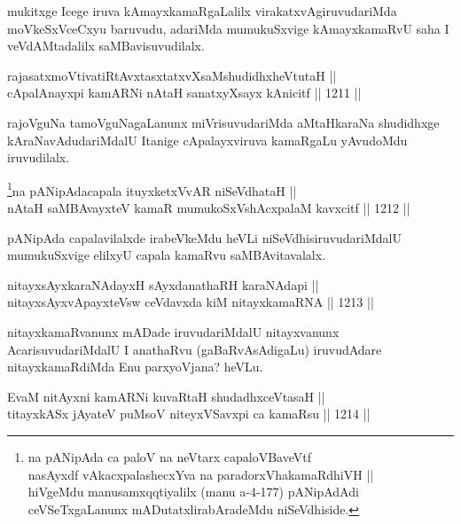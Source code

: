 \begin{artha}
mukitxge Icege iruva kAmayxkamaRgaLalilx virakatxvAgiruvudariMda moVkeSxVceCxyu baruvudu, adariMda mumukuSxvige kAmayxkamaRvU saha I veVdAMtadalilx saMBavisuvudilalx.
\end{artha}

\begin{shl}
rajasatxmoVtivatiRtAvxtasxtatxvXsaMshudidhxheVtutaH || \\
cApalAnayxpi kamARNi nAtaH sanatxyXsayx kAnicitf \hfill || 1211 ||  
\end{shl}

\begin{artha}
rajoVguNa tamoVguNagaLanunx miVrisuvudariMda aMtaHkaraNa shudidhxge kAraNavAdudariMdalU Itanige cApalayxviruva kamaRgaLu yAvudoMdu iruvudilalx.
\end{artha}


\begin{shl}
\footnote{na pANipAda ca paloV na neVtarx capaloVBaveVtf\\nasAyxdf vAkacxpalashecxYva na paradorxVhakamaRdhiVH ||\\ hiVgeMdu manusamxqqtiyalilx (manu a-4-177) pANipAdAdi ceVSeTxgaLanunx mADutatxlira\-bAradeMdu niSeVdhiside.}na pANipAdacapala ituyxketxVvAR niSeVdhataH || \\
nAtaH saMBAvayxteV kamaR mumukoSxVshAcxpalaM kavxcitf \hfill || 1212 ||  
\end{shl}

\begin{artha}
pANipAda capalavilalxde irabeVkeMdu heVLi niSeVdhisiruvuda\-\break riMdalU mumukuSxvige elilxyU capala kamaRvu saMBAvitavalalx.
\end{artha}

\begin{shl}
nitayxsAyxkaraNAdayxH sAyxdanathaRH karaNAdapi || \\
nitayxsAyxvApayxteV\s sw ceVdavxda kiM nitayxkamaRNA \hfill || 1213 ||  
\end{shl}

\begin{artha}
nitayxkamaRvanunx mADade iruvudariMdalU nitayxvanunx AcarisuvudariMdalU I anathaRvu (gaBaRvAsAdigaLu) iruvudAdare nitayxkamaRdiMda Enu parxyoVjana? heVLu.
\end{artha}

\begin{shl}
EvaM nitAyxni kamARNi kuvaRtaH shudadhxceVtasaH || \\
titayxkASx jAyateV puMsoV niteyxVSavxpi ca kamaRsu \hfill || 1214 ||  
\end{shl}

